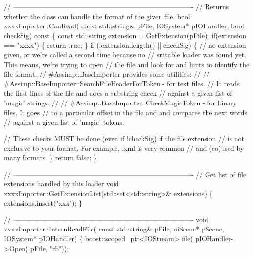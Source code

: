 \begin{DoxyCode}
\textcolor{comment}{// -------------------------------------------------------------------------------}
\textcolor{comment}{// Returns whether the class can handle the format of the given file. }
\textcolor{keywordtype}{bool} xxxxImporter::CanRead( \textcolor{keyword}{const} std::string& pFile, IOSystem* pIOHandler, 
    \textcolor{keywordtype}{bool} checkSig)\textcolor{keyword}{ const}
\textcolor{keyword}{}\{
    \textcolor{keyword}{const} std::string extension = GetExtension(pFile);
    \textcolor{keywordflow}{if}(extension == \textcolor{stringliteral}{"xxxx"}) \{
        \textcolor{keywordflow}{return} \textcolor{keyword}{true};
    \}
    \textcolor{keywordflow}{if} (!extension.length() || checkSig) \{
        \textcolor{comment}{// no extension given, or we're called a second time because no }
        \textcolor{comment}{// suitable loader was found yet. This means, we're trying to open }
        \textcolor{comment}{// the file and look for and hints to identify the file format.}
        \textcolor{comment}{// #Assimp::BaseImporter provides some utilities:}
        \textcolor{comment}{//}
        \textcolor{comment}{// #Assimp::BaseImporter::SearchFileHeaderForToken - for text files.}
        \textcolor{comment}{// It reads the first lines of the file and does a substring check}
        \textcolor{comment}{// against a given list of 'magic' strings.}
        \textcolor{comment}{//}
        \textcolor{comment}{// #Assimp::BaseImporter::CheckMagicToken - for binary files. It goes}
        \textcolor{comment}{// to a particular offset in the file and and compares the next words }
        \textcolor{comment}{// against a given list of 'magic' tokens.}

        \textcolor{comment}{// These checks MUST be done (even if !checkSig) if the file extension }
        \textcolor{comment}{// is not exclusive to your format. For example, .xml is very common }
        \textcolor{comment}{// and (co)used by many formats.}
    \}
    \textcolor{keywordflow}{return} \textcolor{keyword}{false};
\}

\textcolor{comment}{// -------------------------------------------------------------------------------}
\textcolor{comment}{// Get list of file extensions handled by this loader}
\textcolor{keywordtype}{void} xxxxImporter::GetExtensionList(std::set<std::string>& extensions)
\{
    extensions.insert(\textcolor{stringliteral}{"xxx"});
\}

\textcolor{comment}{// -------------------------------------------------------------------------------}
\textcolor{keywordtype}{void} xxxxImporter::InternReadFile( \textcolor{keyword}{const} std::string& pFile, 
    aiScene* pScene, IOSystem* pIOHandler)
\{
    boost::scoped\_ptr<IOStream> file( pIOHandler->Open( pFile, \textcolor{stringliteral}{"rb"}));


\end{DoxyCode}
